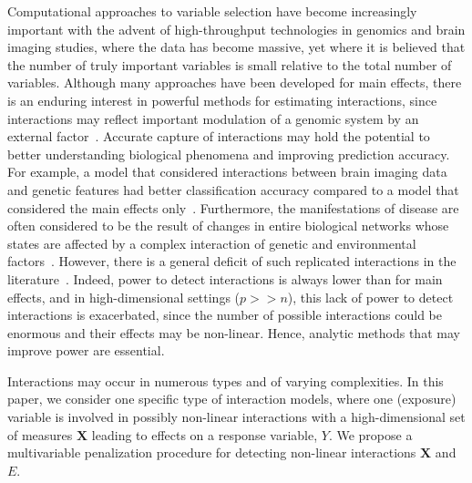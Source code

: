 \documentclass[12pt,letter]{article}\usepackage[]{graphicx}\usepackage[]{color}
\newcommand{\mb}[1]{\mathbf{#1}}
\begin{document}
Computational approaches to variable selection have become increasingly important with the advent of high-throughput technologies in genomics and brain imaging studies, where the data has become massive, yet where it is believed that the number of truly important variables is small relative to the total number of variables. 
Although many approaches have been developed for main effects, there is an enduring interest in powerful methods for estimating interactions, since interactions may reflect important modulation of a genomic system by an external factor~\citep{bhatnagar2018analytic}. 
Accurate capture of interactions may hold the potential to better understanding  biological phenomena and improving prediction accuracy. 
For example, a model that considered interactions between brain imaging data and genetic features had better classification accuracy compared to a model that considered the main effects only~\citep{ning2018classifying}. 
Furthermore, the manifestations of disease are often considered to be the result of changes in entire biological networks whose states are affected by a complex interaction of genetic and environmental factors~\citep{schadt2009molecular}. 
However, there is a general deficit of such replicated interactions in the literature~\citep{timpson2018genetic}.   
Indeed, power to detect interactions is always lower than for  main effects, and in high-dimensional settings ($p >> n$), this lack of power to detect interactions is exacerbated, since the number of possible interactions could be enormous and their effects may be non-linear. Hence, analytic methods that may improve power are essential.  

Interactions may occur in numerous types and of varying complexities. In this paper, we consider one specific type of interaction models, where one (exposure) variable is involved in possibly non-linear interactions with a high-dimensional set of measures $\mb{X}$ leading to effects on a response variable, $Y$. We propose a multivariable penalization procedure for detecting non-linear interactions $\mb{X}$ and $E$. 


\end{document}
